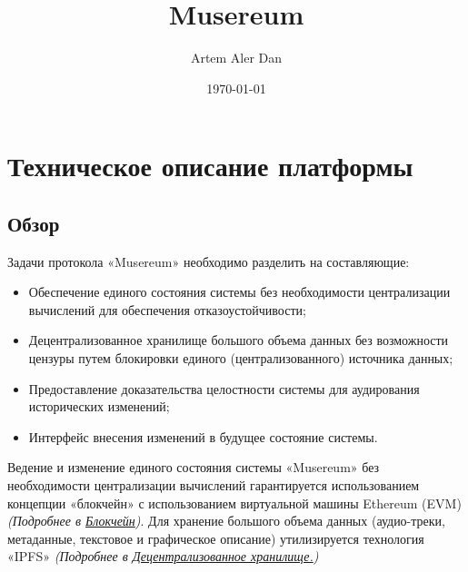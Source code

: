 \documentclass[12pt]{report}
\title{Musereum}
\author{Artem Aler Dan}
\date{\today}
\begin{document}
\maketitle
\pagebreak
\tableofcontents
\pagebreak

\chapter{Техническое описание платформы}

\section{Обзор}
\label{tech-review}
\begin{multicols}{2}
Задачи протокола «Musereum» необходимо разделить на составляющие:
\begin{itemize}
\item Обеспечение единого состояния системы без необходимости централизации вычислений для обеспечения отказоустойчивости;
\item Децентрализованное хранилище большого объема данных без возможности цензуры путем блокировки единого (централизованного) источника данных;
\item Предоставление доказательства целостности системы для аудирования исторических изменений;
\item Интерфейс внесения изменений в будущее состояние системы.
\end{itemize}
\vfill\null
\columnbreak
Ведение и изменение единого состояния системы «Musereum» без необходимости централизации вычислений гарантируется использованием концепции «блокчейн» с использованием виртуальной машины Ethereum (EVM) \textit{(Подробнее в \hyperref[tech-blockchain]{Блокчейн})}.
Для хранение большого объема данных (аудио-треки, метаданные, текстовое и графическое описание) утилизируется технология «IPFS» \textit{(Подробнее в \hyperref[tech-storage]{Децентрализованное хранилище.})}
\end{multicols}
\pagebreak
\end{document}
